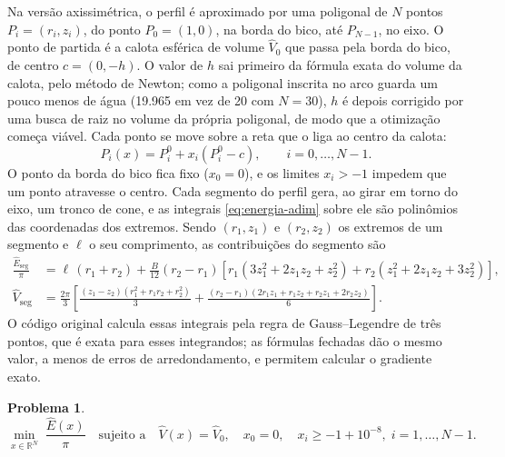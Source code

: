 \documentclass[12pt, oneside, a4paper, english, brazil]{abntex2}
\theoremstyle{relatorio}
\theoremstyle{relatorioit}
\theoremstyle{problema}
\newtheorem{problema}{Problema}[section]
\newcommand{\Vh}{\hat V}
\newcommand{\Eh}{\hat E}
\begin{document}
Na versão axissimétrica, o perfil é aproximado por uma poligonal de $N$ pontos
$P_i = (r_i, z_i)$, do ponto $P_0 = (1, 0)$, na borda do bico, até $P_{N-1}$, no eixo. O
ponto de partida é a calota esférica de volume $\Vh_0$ que passa pela borda do bico,
de centro $c = (0, -h)$. O valor de $h$ sai primeiro da fórmula exata do volume da
calota, pelo método de Newton; como a poligonal inscrita no arco guarda um pouco menos
de água (\num{19.965} em vez de 20 com $N = 30$), $h$ é depois corrigido por uma busca
de raiz no volume da própria poligonal, de modo que a otimização começa viável. Cada
ponto se move sobre a
reta que o liga ao centro da calota:
\begin{equation}
  P_i(x) = P_i^0 + x_i \left(P_i^0 - c\right), \qquad i = 0, \ldots, N - 1.
  \label{eq:parametrizacao}
\end{equation}
O ponto da borda do bico fica fixo ($x_0 = 0$), e os limites $x_i > -1$ impedem que um
ponto atravesse o centro. Cada segmento do perfil gera, ao girar em torno do eixo, um
tronco de cone, e as integrais \eqref{eq:energia-adim} sobre ele são polinômios das
coordenadas dos extremos. Sendo $(r_1, z_1)$ e $(r_2, z_2)$ os extremos de um segmento
e $\ell$ o seu comprimento, as contribuições do segmento são
\begin{align}
  \frac{\Eh_{\mathrm{seg}}}{\pi} &= \ell\,(r_1 + r_2) + \frac{B}{12}(r_2 - r_1)
    \left[ r_1 \left(3z_1^2 + 2z_1z_2 + z_2^2\right) + r_2 \left(z_1^2 + 2z_1z_2 + 3z_2^2\right) \right],
  \label{eq:energia-segmento} \\
  \Vh_{\mathrm{seg}} &= \frac{2\pi}{3} \left[ \frac{(z_1 - z_2)\left(r_1^2 + r_1 r_2 + r_2^2\right)}{3}
    + \frac{(r_2 - r_1)\left(2r_1z_1 + r_1z_2 + r_2z_1 + 2r_2z_2\right)}{6} \right].
  \label{eq:volume-segmento}
\end{align}
O código original calcula essas integrais pela regra de Gauss--Legendre de três pontos,
que é exata para esses integrandos; as fórmulas fechadas dão o mesmo valor, a menos de
erros de arredondamento, e permitem calcular o gradiente exato.

\begin{problema}
\begin{equation}
  \min_{x \in \mathbb{R}^N} \; \frac{\Eh(x)}{\pi} \quad \text{sujeito a} \quad
  \Vh(x) = \Vh_0, \quad x_0 = 0, \quad x_i \ge -1 + 10^{-8}, \; i = 1, \ldots, N - 1.
  \label{eq:problema-discreto}
\end{equation}
\label{prob:discreto}
\end{problema}
\end{document}
